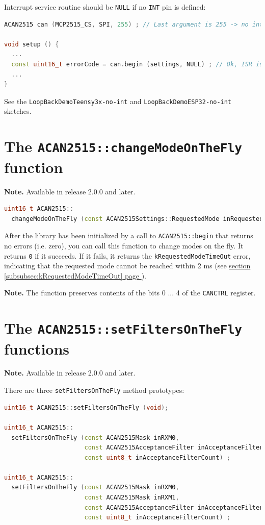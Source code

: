 \documentclass[9pt, a4paper, obeyspaces]{extarticle}
\newcommand \sectionLabel[2]{\section{#1}\label{sec:#2}}
\newcommand\refSubsubsectionPage[1]{\hyperref[subsubsec:#1]{section \ref*{subsubsec:#1} page \pageref{subsubsec:#1}}}
\begin{document}
Interrupt service routine should be \texttt{NULL} if no \texttt{INT} pin is defined:
{ \small\begin{lstlisting}[language=c++]
ACAN2515 can (MCP2515_CS, SPI, 255) ; // Last argument is 255 -> no interrupt pin

void setup () {
  ...
  const uint16_t errorCode = can.begin (settings, NULL) ; // Ok, ISR is null
  ...
}
\end{lstlisting}}

See the \texttt{LoopBackDemoTeensy3x-no-int} and \texttt{LoopBackDemoESP32-no-int} sketches.













\sectionLabel{The \texttt{ACAN2515::changeModeOnTheFly} function}{changeModeOnTheFlyFunction}

{\bf Note. } Available in release 2.0.0 and later.

{ \small\begin{lstlisting}[language=c++]
uint16_t ACAN2515::
  changeModeOnTheFly (const ACAN2515Settings::RequestedMode inRequestedMode);
\end{lstlisting}}

After the library has been initialized by a call to \texttt{ACAN2515::begin} that returns no errors (i.e. zero), you can call this function to change modes on the fly. It returns \texttt{0} if it succeeds. If it fails, it returns the \texttt{kRequestedModeTimeOut} error, indicating that the requested mode cannot be reached within 2 ms (see \refSubsubsectionPage{kRequestedModeTimeOut}).

{\bf Note. } The function preserves contents of the bits 0 ... 4 of the \texttt{CANCTRL} register.
















\sectionLabel{The \texttt{ACAN2515::setFiltersOnTheFly} functions}{setFiltersOnTheFlyFunction}

{\bf Note. } Available in release 2.0.0 and later.

There are three \texttt{setFiltersOnTheFly} method prototypes:

{ \small\begin{lstlisting}[language=c++]
uint16_t ACAN2515::setFiltersOnTheFly (void);

uint16_t ACAN2515::
  setFiltersOnTheFly (const ACAN2515Mask inRXM0,
                      const ACAN2515AcceptanceFilter inAcceptanceFilters [],
                      const uint8_t inAcceptanceFilterCount) ;

uint16_t ACAN2515::
  setFiltersOnTheFly (const ACAN2515Mask inRXM0,
                      const ACAN2515Mask inRXM1,
                      const ACAN2515AcceptanceFilter inAcceptanceFilters [],
                      const uint8_t inAcceptanceFilterCount) ;
\end{lstlisting}}
\end{document}
